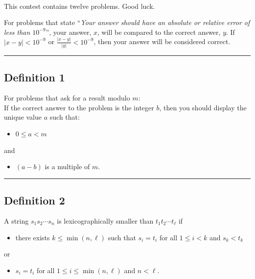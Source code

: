 \documentclass[noproblemids,a4paper]{problemset}
\begin{document}
\clearpage

~
\vskip 40pt

\begin{center}
This contest contains twelve problems. Good luck.
\end{center}

\vskip 20pt
For problems that state ``\textit{Your answer should have an absolute or relative error of less than $10^{-9}$}'', your answer, $x$, will be compared to the correct answer, $y$. If $|x-y| < 10^{-9}$ or $\frac{|x-y|}{|y|} < 10^{-9}$, then your answer will be considered correct.

\vskip 20pt
\hrule
\vskip 20pt

\subsection*{Definition 1}

For problems that ask for a result modulo $m$: \\ If the correct answer to the problem is the integer $b$, then you should display the unique value $a$ such that:


\begin{itemize}
\item $0 \leq a < m$
\end{itemize}

\vskip-10pt
\hskip30pt and

\begin{itemize}
\item \vskip-10pt $(a-b)$ is a multiple of $m$.
\end{itemize}

\vskip 20pt
\hrule
\vskip 20pt

\subsection*{Definition 2}

A string $s_1s_2 \cdots s_n$ is lexicographically smaller than $t_1t_2\cdots t_\ell$ if

\begin{itemize}
\item there exists $k \leq \min(n,\ell)$ such that $s_i = t_i$ for all $1 \leq i < k$ and $s_k < t_k$
\end{itemize}

\vskip-10pt
\hskip30pt or

\begin{itemize}
 \item \vskip-10pt $s_i = t_i$ for all $1 \leq i \leq \min(n,\ell)$ and $n < \ell$.
\end{itemize}
\end{document}

